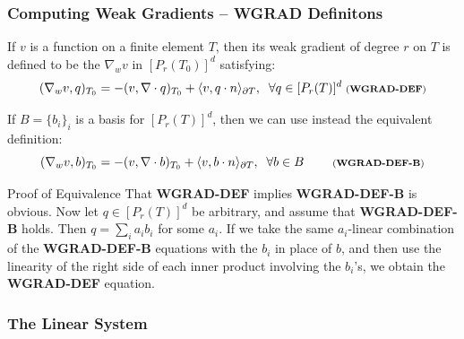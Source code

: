 \documentclass[compress]{beamer}
\begin{document}
\begin{frame}
  \frametitle{Computing Weak Gradients -- WGRAD Definitons}
  If $v$ is a function on a finite element $T$, then its weak gradient of degree $r$ on $T$
  is defined to be the $\nabla_w v$ in $[P_r(T_0)]^d$ satisfying:\\
  \vspace{-0.25cm}
  \begin{equation*}
    (\nabla_w v, q)_{T_0} = -(v, \nabla \cdot q)_{T_0} + \langle v, q \cdot n \rangle_{\partial T}, \;\; \forall q \in [P_r(T)]^d
    \;\text{\scriptsize (\textbf{WGRAD-DEF})}
  \end{equation*}
  \pause
  
  If $B=\{b_i\}_i$ is a basis for $[P_r(T)]^d$, then we can use instead the equivalent definition:
  \begin{equation*}
    (\nabla_w v, b)_{T_0} = -(v, \nabla \cdot b)_{T_0} + \langle v, b \cdot n \rangle_{\partial T}, \;\; \forall b \in B 
    \;\quad\quad \text{\scriptsize (\textbf{WGRAD-DEF-B})}
  \end{equation*}
  \pause
  \begin{block}{Proof of Equivalence}
    \small
    That {\scriptsize \textbf{WGRAD-DEF}} implies {\scriptsize \textbf{WGRAD-DEF-B}} is obvious. Now let $q \in [P_r(T)]^d$ be
    arbitrary, and assume that {\scriptsize \textbf{WGRAD-DEF-B}} holds. Then $q = \sum_i {a_i b_i}$ for some $a_i$. If we take
    the same ${a_i}$-linear combination of the {\scriptsize \textbf{WGRAD-DEF-B}} equations with the $b_i$ in place of $b$,
    and then use the linearity of the right side of each inner product involving the $b_i$'s, we obtain the 
    {\scriptsize \textbf{WGRAD-DEF}} equation.
  \end{block}
\end{frame}

\subsubsection{The Linear System}
\end{document}
